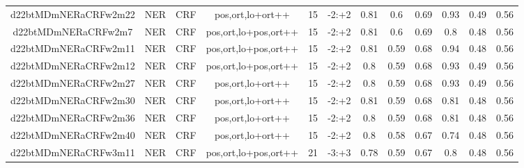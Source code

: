 \documentclass[a4paper]{article}
\begin{document}
\begin{landscape}
\begin{center}
\begin{tabular}{ |c|c|c|c|c|c|c|c|c|c|c|c|}
 
 	
 	\small{ d22btMDmNERaCRFw2m22 } & \small{ NER} & \small{  CRF }  & pos,ort,lo+ort++  &  15 &  \small{  -2:+2 }  &  0.81 & 0.6 & 0.69  &  0.93 & 0.49 & 0.56 \\
 	

 
 	
 	\small{ d22btMDmNERaCRFw2m7 } & \small{ NER} & \small{  CRF }  & pos,ort,lo+pos,ort++  &  15 &  \small{  -2:+2 }  &  0.81 & 0.6 & 0.69  &  0.8 & 0.48 & 0.56 \\
 	

 
 	
 	\small{ d22btMDmNERaCRFw2m11 } & \small{ NER} & \small{  CRF }  & pos,ort,lo+pos,ort++  &  15 &  \small{  -2:+2 }  &  0.81 & 0.59 & 0.68  &  0.94 & 0.48 & 0.56 \\
 	

 
 	
 	\small{ d22btMDmNERaCRFw2m12 } & \small{ NER} & \small{  CRF }  & pos,ort,lo+pos,ort++  &  15 &  \small{  -2:+2 }  &  0.8 & 0.59 & 0.68  &  0.93 & 0.49 & 0.56 \\
 	

 
 	
 	\small{ d22btMDmNERaCRFw2m27 } & \small{ NER} & \small{  CRF }  & pos,ort,lo+ort++  &  15 &  \small{  -2:+2 }  &  0.8 & 0.59 & 0.68  &  0.93 & 0.49 & 0.56 \\
 	

 
 	
 	\small{ d22btMDmNERaCRFw2m30 } & \small{ NER} & \small{  CRF }  & pos,ort,lo+ort++  &  15 &  \small{  -2:+2 }  &  0.81 & 0.59 & 0.68  &  0.81 & 0.48 & 0.56 \\
 	

 
 	
 	\small{ d22btMDmNERaCRFw2m36 } & \small{ NER} & \small{  CRF }  & pos,ort,lo+ort++  &  15 &  \small{  -2:+2 }  &  0.8 & 0.59 & 0.68  &  0.81 & 0.48 & 0.56 \\
 	

 
 	
 	\small{ d22btMDmNERaCRFw2m40 } & \small{ NER} & \small{  CRF }  & pos,ort,lo+ort++  &  15 &  \small{  -2:+2 }  &  0.8 & 0.58 & 0.67  &  0.74 & 0.48 & 0.56 \\
 	

 
 	
 	\small{ d22btMDmNERaCRFw3m11 } & \small{ NER} & \small{  CRF }  & pos,ort,lo+pos,ort++  &  21 &  \small{  -3:+3 }  &  0.78 & 0.59 & 0.67  &  0.8 & 0.48 & 0.56 \\
 	


\end{tabular}
\end{center}
\end{landscape}
\end{document}
